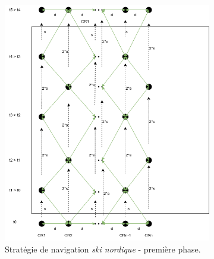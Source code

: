 \documentclass[francais,RandD]{rapportPFE}
\begin{document}
				\begin{figure}[h!]
					\centering
					\begin{subfigure}[t]{0.45\linewidth}
						\centering
						\includegraphics[width=\linewidth]{graphics/ski_nordique_1.png}
						\caption{Stratégie de navigation \textit{ski nordique} - première phase.}
						\label{fig:ski_nordique_1}
					\end{subfigure}
					\hfill
					\begin{subfigure}[t]{0.45\linewidth}
						\centering

\end{subfigure}
\end{figure}
\end{document}
